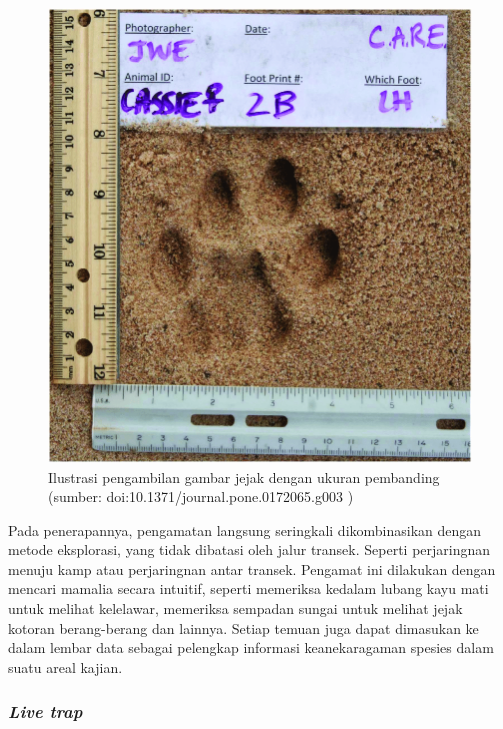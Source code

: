 \documentclass[
  oneside]{book}
\begin{document}
\begin{figure}

{\centering \includegraphics[width=1\linewidth]{images/pugmark} 

}

\caption{Ilustrasi pengambilan gambar jejak dengan ukuran pembanding (sumber: doi:10.1371/journal.pone.0172065.g003 )}\label{fig:pugm}
\end{figure}

Pada penerapannya, pengamatan langsung seringkali dikombinasikan dengan metode eksplorasi, yang tidak dibatasi oleh jalur transek. Seperti perjaringnan menuju kamp atau perjaringnan antar transek. Pengamat ini dilakukan dengan mencari mamalia secara intuitif, seperti memeriksa kedalam lubang kayu mati untuk melihat kelelawar, memeriksa sempadan sungai untuk melihat jejak kotoran berang-berang dan lainnya. Setiap temuan juga dapat dimasukan ke dalam lembar data sebagai pelengkap informasi keanekaragaman spesies dalam suatu areal kajian.

\hypertarget{live-trap}{%
\subsubsection*{\texorpdfstring{\emph{Live trap}}{Live trap}}\label{live-trap}}
\end{document}
